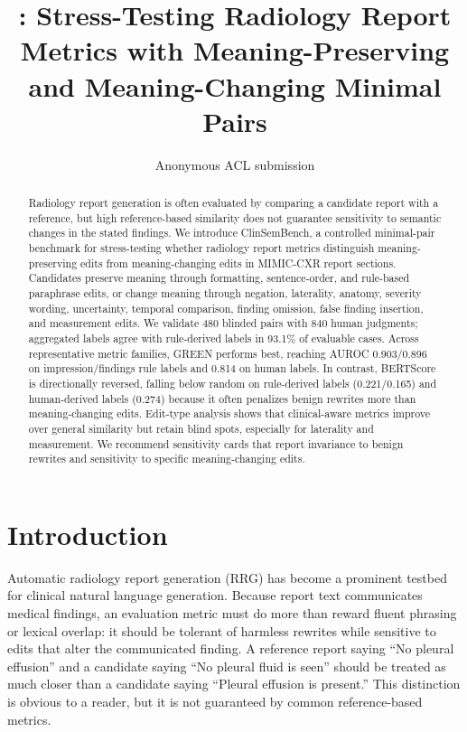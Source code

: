 \documentclass[11pt]{article}
\title{\bench: Stress-Testing Radiology Report Metrics with Meaning-Preserving and Meaning-Changing Minimal Pairs}
\author{Anonymous ACL submission}
\newcommand{\bench}{ClinSemBench\xspace}
\newcommand{\pres}{meaning-preserving\xspace}
\newcommand{\chg}{meaning-changing\xspace}
\begin{document}
\maketitle

\begin{abstract}
Radiology report generation is often evaluated by comparing a candidate report with a reference, but high reference-based similarity does not guarantee sensitivity to semantic changes in the stated findings.
We introduce \bench, a controlled minimal-pair benchmark for stress-testing whether radiology report metrics distinguish \pres edits from \chg edits in MIMIC-CXR report sections.
Candidates preserve meaning through formatting, sentence-order, and rule-based paraphrase edits, or change meaning through negation, laterality, anatomy, severity wording, uncertainty, temporal comparison, finding omission, false finding insertion, and measurement edits.
We validate 480 blinded pairs with 840 human judgments; aggregated labels agree with rule-derived labels in 93.1\% of evaluable cases.
Across representative metric families, GREEN performs best, reaching AUROC 0.903/0.896 on impression/findings rule labels and 0.814 on human labels.
In contrast, BERTScore is directionally reversed, falling below random on rule-derived labels (0.221/0.165) and human-derived labels (0.274) because it often penalizes benign rewrites more than meaning-changing edits.
Edit-type analysis shows that clinical-aware metrics improve over general similarity but retain blind spots, especially for laterality and measurement.
We recommend sensitivity cards that report invariance to benign rewrites and sensitivity to specific meaning-changing edits.
\end{abstract}

\section{Introduction}

Automatic radiology report generation (RRG) has become a prominent testbed for clinical natural language generation. Because report text communicates medical findings, an evaluation metric must do more than reward fluent phrasing or lexical overlap: it should be tolerant of harmless rewrites while sensitive to edits that alter the communicated finding. A reference report saying ``No pleural effusion'' and a candidate saying ``No pleural fluid is seen'' should be treated as much closer than a candidate saying ``Pleural effusion is present.'' This distinction is obvious to a reader, but it is not guaranteed by common reference-based metrics.
\end{document}
